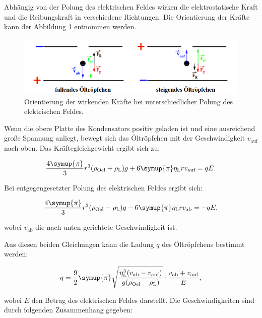 Abhängig von der Polung des elektrischen Feldes wirken die elektrostatische Kraft und die Reibungskraft in verschiedene Richtungen. Die Orientierung 
der Kräfte kann der Abbildung \ref{fig:Kraeftegleichgewicht} entnommen werden.

\begin{figure}
    \centering
    \includegraphics[width = .9\textwidth]{Bilder/Kraeftegleichgewicht.png}
    \caption{Orientierung der wirkenden Kräfte bei unterschiedlicher Polung des elektrischen Feldes. \cite{1}}
    \label{fig:Kraeftegleichgewicht}
\end{figure}

Wenn die obere Platte des Kondensators positiv geladen ist und eine ausreichend große Spannung anliegt, bewegt sich das Öltröpfchen mit der 
Geschwindigkeit $v_\text{auf}$ nach oben. Das Kräftegleichgewicht ergibt sich zu:

\begin{equation*}
    \label{eqn:Kraefte_1}
    \frac{4\symup{\pi}}{3}r^3(\rho_\text{Oel} + \rho_\text{L})g + 6 \symup{\pi} \eta_\text{L}r v_\text{auf} = qE.
\end{equation*}

Bei entgegengesetzter Polung des elektrischen Feldes ergibt sich:

\begin{equation*}
    \label{eqn:Kraefte_2}
    \frac{4\symup{\pi}}{3}r^3(\rho_\text{Oel}- \rho_\text{L})g - 6 \symup{\pi} \eta_\text{L}r v_{\text{ab}} = -qE,
\end{equation*}

wobei $v_{\text{ab}}$ die nach unten gerichtete Geschwindigkeit ist.

Aus diesen beiden Gleichungen kann die Ladung $q$ des Öltröpfchens bestimmt werden:

\begin{equation}
    \label{eqn:q}
    q = \frac{9}{2} \symup{\pi} \sqrt{\frac{\eta_\text{L}^3(v_\text{ab} - v_\text{auf})}{g(\rho_\text{Oel}- \rho_\text{L})}} \cdot \frac{v_\text{ab} + v_\text{auf}}{E},
\end{equation}

wobei $E$ den Betrag des elektrischen Feldes darstellt. Die Geschwindigkeiten sind durch folgenden Zusammenhang gegeben:

